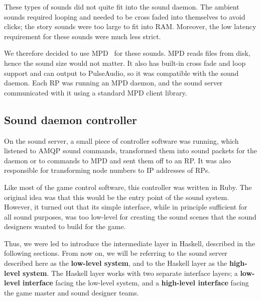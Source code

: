 These types of sounds did not quite fit into the sound daemon. The
ambient sounds required looping and needed to be cross faded into
themselves to avoid clicks; the story sounds were too large to fit
into RAM\@. Moreover, the low latency requirement for these
sounds were much less strict.

We therefore decided to use MPD~\cite{mpd} for these sounds. MPD reads
files from disk, hence the sound size would not matter. It also has built-in
cross fade and loop support and can output to PulseAudio, so it was compatible with the sound daemon. Each RP was running an MPD daemon,
and the sound server communicated with it using a standard MPD client library.

\subsection{Sound daemon controller}

On the sound server, a small piece of controller software was running, which listened
to AMQP sound commands, transformed them into sound packets for the
daemon or to commands to MPD and sent them off to an RP\@. It was also responsible for transforming node numbers to IP addresses of RPs.

Like most of the game control software, this controller was written in
Ruby. The original idea was that this would be the entry point of the
sound system. However, it turned out that its simple interface, while
in principle sufficient for all sound purposes, was too low-level for
creating the sound scenes that the sound designers wanted to build for
the game. 

Thus, we were led to introduce the intermediate layer in Haskell,
described in the following sections. From now on, we will be referring
to the sound server described here as the \textbf{low-level system},
and to the Haskell layer as the \textbf{high-level system}. The
Haskell layer works with two separate interface layers; a
\textbf{low-level interface} facing the low-level system, and a
\textbf{high-level interface} facing the game master and sound
designer teams.


